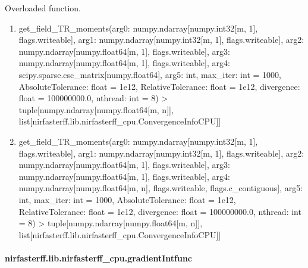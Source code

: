 \documentclass[letterpaper,10pt,english]{sphinxmanual}
\begin{document}
\begin{fulllineitems}
\label{\detokenize{_autosummary/nirfasterff.lib.nirfasterff_cpu.get_field_TR_moments:nirfasterff.lib.nirfasterff_cpu.get_field_TR_moments}}
\pysigstartsignatures
{}
\pysigstopsignatures
\sphinxAtStartPar
Overloaded function.
\begin{enumerate}
%
\item {} 
\sphinxAtStartPar
get\_field\_TR\_moments(arg0: numpy.ndarray{[}numpy.int32{[}m, 1{]}, flags.writeable{]}, arg1: numpy.ndarray{[}numpy.int32{[}m, 1{]}, flags.writeable{]}, arg2: numpy.ndarray{[}numpy.float64{[}m, 1{]}, flags.writeable{]}, arg3: numpy.ndarray{[}numpy.float64{[}m, 1{]}, flags.writeable{]}, arg4: scipy.sparse.csc\_matrix{[}numpy.float64{]}, arg5: int, max\_iter: int = 1000, AbsoluteTolerance: float = 1e\sphinxhyphen{}12, RelativeTolerance: float = 1e\sphinxhyphen{}12, divergence: float = 100000000.0, nthread: int = 8) \sphinxhyphen{}\textgreater{} tuple{[}numpy.ndarray{[}numpy.float64{[}m, n{]}{]}, list{[}nirfasterff.lib.nirfasterff\_cpu.ConvergenceInfoCPU{]}{]}

\item {} 
\sphinxAtStartPar
get\_field\_TR\_moments(arg0: numpy.ndarray{[}numpy.int32{[}m, 1{]}, flags.writeable{]}, arg1: numpy.ndarray{[}numpy.int32{[}m, 1{]}, flags.writeable{]}, arg2: numpy.ndarray{[}numpy.float64{[}m, 1{]}, flags.writeable{]}, arg3: numpy.ndarray{[}numpy.float64{[}m, 1{]}, flags.writeable{]}, arg4: numpy.ndarray{[}numpy.float64{[}m, n{]}, flags.writeable, flags.c\_contiguous{]}, arg5: int, max\_iter: int = 1000, AbsoluteTolerance: float = 1e\sphinxhyphen{}12, RelativeTolerance: float = 1e\sphinxhyphen{}12, divergence: float = 100000000.0, nthread: int = 8) \sphinxhyphen{}\textgreater{} tuple{[}numpy.ndarray{[}numpy.float64{[}m, n{]}{]}, list{[}nirfasterff.lib.nirfasterff\_cpu.ConvergenceInfoCPU{]}{]}

\end{enumerate}

\end{fulllineitems}


\sphinxstepscope


\paragraph{nirfasterff.lib.nirfasterff\_cpu.gradientIntfunc}
\label{\detokenize{_autosummary/nirfasterff.lib.nirfasterff_cpu.gradientIntfunc:nirfasterff-lib-nirfasterff-cpu-gradientintfunc}}\label{\detokenize{_autosummary/nirfasterff.lib.nirfasterff_cpu.gradientIntfunc::doc}}
\end{document}

